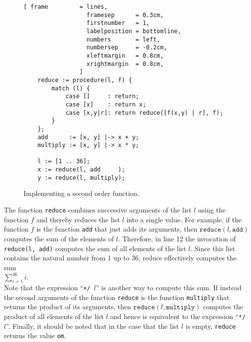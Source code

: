 \begin{figure}[!ht]
\centering
\begin{Verbatim}[ frame         = lines, 
                  framesep      = 0.3cm, 
                  firstnumber   = 1,
                  labelposition = bottomline,
                  numbers       = left,
                  numbersep     = -0.2cm,
                  xleftmargin   = 0.8cm,
                  xrightmargin  = 0.8cm,
                ]
    reduce := procedure(l, f) {
        match (l) {
            case []     : return;
            case [x]    : return x;
            case [x,y|r]: return reduce([f(x,y) | r], f);
        }    
    };
    add      := [x, y] |-> x + y;
    multiply := [x, y] |-> x * y;
    
    l := [1 .. 36];
    x := reduce(l, add     );
    y := reduce(l, multiply);
\end{Verbatim}
\vspace*{-0.3cm}
\caption{Implementing a second order function.}
\label{fig:reduce.stlx}
\end{figure}
The function \texttt{reduce} combines successive arguments of the list $l$ using the function $f$
and thereby reduces the list $l$ into a single value.  For example, if the function $f$ is the
function \texttt{add} that just adds its arguments, then $\texttt{reduce}(l,
\texttt{add})$ computes the sum of
the elements of $l$.  Therefore, in line 12 the invocation of
\texttt{reduce(l, add)} computes the sum of all elements of the list $l$.  Since this list 
contains the natural number from 1 up to 36, reduce effectively computes the sum
\\[0.2cm]
\hspace*{1.3cm}
 $\sum\limits_{i=1}^{36} i$. 
\\[0.2cm] 
Note that the expression ``\texttt{+/ $l$}'' is another way to compute this sum.
If instead the second arguments of the function \texttt{reduce} is the function
\texttt{multiply} that returns the product of its arguments, then 
$\texttt{reduce}(l, \texttt{multiply})$ computes the product of all elements of the list
$l$ and hence is equivalent to the expression ``\texttt{*/ $l$}''.
Finally, it should be noted that in the case that the list $l$ is empty,
\texttt{reduce} returns the value \texttt{om}. 


